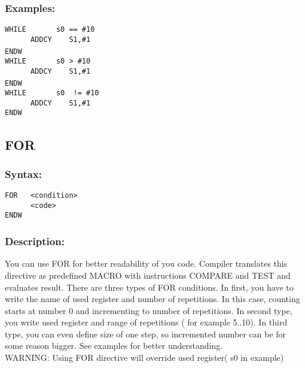         \subsubsection{Examples:}
        {
            \usecodefont
            \verb'WHILE       s0 == #10'\\
            \verb'      ADDCY    S1,#1'\\
            \verb'ENDW'
            ~\\
            \usecodefont
            \verb'WHILE       s0 > #10'\\
            \verb'      ADDCY    S1,#1'\\
            \verb'ENDW'
            ~\\
            \usecodefont
            \verb'WHILE       s0  != #10'\\
            \verb'      ADDCY    S1,#1'\\
            \verb'ENDW'
        }

    \subsection{FOR}
        \subsubsection{Syntax:}
        {
            \usecodefont
            \verb'FOR   <condition>'\\
            \verb'      <code>'\\
            \verb'ENDW'
        }

        \subsubsection{Description:}
            You can use FOR for better readability of you code. Compiler translates this directive as predefined MACRO with instructions COMPARE and TEST and evaluates result. There are three types of FOR conditions. In first, you have to write the name of used register and number of repetitions. In this case, counting starts at number 0 and incrementing to number of repetitions. In second type, you write used register and range of repetitions ( for example 5..10). In third type, you can even define size of one step, so incremented number can be for some reason bigger. See examples for better understanding.\\ WARNING: Using FOR directive will override used register( s0 in example)

